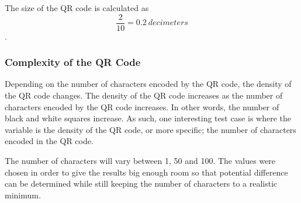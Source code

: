 The size of the QR code is calculated as \[\frac{2}{10} = 0.2~decimeters\].

       
		

\subsubsection{Complexity of the QR Code}
Depending on the number of characters encoded by the QR code, the density of the QR code changes. The density of the QR code increases as the number of characters encoded by the QR code increases. In other words, the number of black and white squares increase. As such, one interesting test case is where the variable is the density of the QR code, or more specific; the number of characters encoded in the QR code.

The number of characters will vary between 1, 50 and 100. The values were chosen in order to give the results big enough room so that potential difference can be determined while still keeping the number of characters to a realistic minimum. %

       
